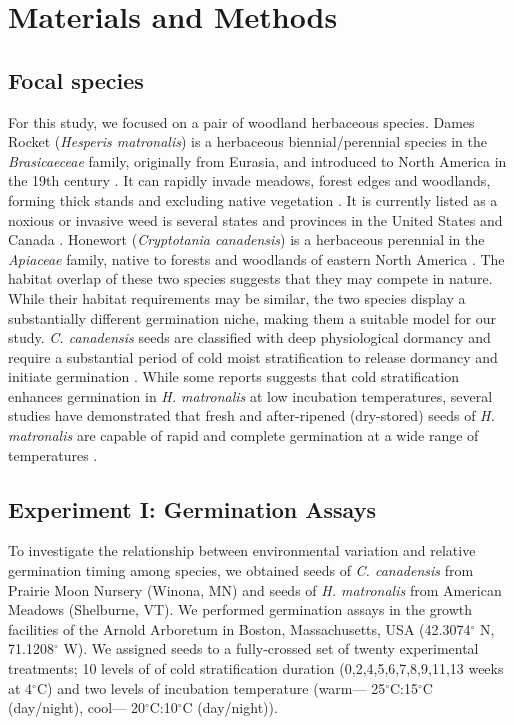 \documentclass{article}[11pt]
\begin{document}
\section*{Materials and Methods}

\subsection*{Focal species}
 For this study, we focused on a pair of woodland herbaceous species. Dames Rocket (\textit{Hesperis matronalis}) is a herbaceous biennial/perennial species in the \textit{Brasicaeceae} family, originally from Eurasia, and introduced to North America in the 19th century \citep{Francis:2009wz}. It  can rapidly invade  meadows, forest edges and woodlands, forming thick stands and excluding native vegetation \citep{Francis:2009wz}. It is currently listed as a noxious or invasive weed is several states and provinces in the United States and Canada \citep{Susko:2008ut}. Honewort (\textit{Cryptotania canadensis}) is a herbaceous perennial in the \textit{Apiaceae} family, native to forests and woodlands of eastern North America \citep{Hawkins:2007vb}. The  habitat overlap of these two species suggests that they may compete in nature. While their habitat requirements may be similar, the two species display a substantially different germination niche, making them a suitable model for our study. \textit{C. canadensis} seeds are classified with deep physiological dormancy and require a substantial period of cold moist stratification to release dormancy and initiate germination \citep{Baskin:1988um}. While some reports suggests that cold stratification enhances germination in \textit{H. matronalis} at low incubation temperatures, several studies have demonstrated that fresh and after-ripened (dry-stored) seeds of \textit{H. matronalis} are capable of rapid and complete germination at a wide range of temperatures \citep{Susko:2008ut}. %

\subsection*{Experiment I: Germination Assays}
To investigate the relationship between environmental variation and relative germination timing among species, we obtained seeds of \textit{C. canadensis} from Prairie Moon Nursery (Winona, MN) and seeds of \textit{H. matronalis} from American Meadows (Shelburne, VT). %
We performed germination assays in the growth facilities of the Arnold Arboretum in Boston, Massachusetts, USA (42.3074$^{\circ}$ N, 71.1208$^{\circ}$ W). We assigned seeds to a fully-crossed set of twenty experimental treatments; 10 levels of of cold stratification duration (0,2,4,5,6,7,8,9,11,13 weeks at 4$^{\circ}$C) and two levels of incubation temperature (warm--- 25$^{\circ}$C:15$^{\circ}$C (day/night), cool--- 20$^{\circ}$C:10$^{\circ}$C (day/night)).
\end{document}
